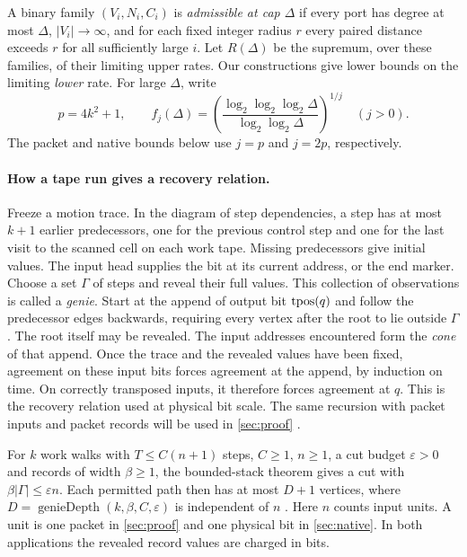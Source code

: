 A binary family $(V_i,N_i,C_i)$ is \emph{admissible at cap $\Delta$} if
every port has degree at most $\Delta$, $|V_i|\to\infty$, and for each
fixed integer radius $r$ every paired distance exceeds $r$ for all
sufficiently large $i$. Let $R(\Delta)$ be the supremum, over these
families, of their limiting upper rates. Our constructions give lower
bounds on the limiting \emph{lower} rate. For large $\Delta$, write
\[
 p=4k^2+1,\qquad
 f_j(\Delta)=\left(\frac{\log_2\log_2\log_2\Delta}
                         {\log_2\log_2\Delta}\right)^{1/j}\quad(j>0).
\]
The packet and native bounds below use $j=p$ and $j=2p$, respectively.

\paragraph{How a tape run gives a recovery relation.}
Freeze a motion trace. In the diagram of step dependencies, a step has
at most $k+1$ earlier predecessors, one for the previous control step
and one for the last visit to the scanned cell on each work tape. Missing predecessors
give initial values. The input head supplies the bit at its current
address, or the end marker. Choose a set $\Gamma$ of steps and reveal
their full values. This collection of observations is called a
\emph{genie}. Start at the append of output bit $\operatorname{tpos}(q)$ and follow
the predecessor edges backwards, requiring every vertex after the root to lie outside $\Gamma$. The root
itself may be revealed.
The input addresses encountered form the \emph{cone} of that append.
Once the trace and the revealed values have been fixed, agreement on
these input bits forces agreement at the append, by induction on time.
On correctly transposed inputs, it therefore forces agreement at $q$.
This is the recovery relation used at physical bit scale. The same
recursion with packet inputs and packet records will be used in
\cref{sec:proof} \cite[\S4]{PaperEleven}.

For $k$ work walks with $T\le C(n+1)$ steps, $C\ge1$, $n\ge1$, a cut
budget $\varepsilon>0$ and records of width $\beta\ge1$, the bounded-stack theorem gives a cut with
$\beta|\Gamma|\le\varepsilon n$. Each permitted path then has at most
$D+1$ vertices, where $D=\operatorname{genieDepth}(k,\beta,C,\varepsilon)$
is independent of $n$ \cite[Corollary~O(a)]{PaperFourteen}. Here $n$
counts input units. A unit is one packet in \cref{sec:proof} and one
physical bit in \cref{sec:native}. In both applications the revealed
record values are charged in bits.
